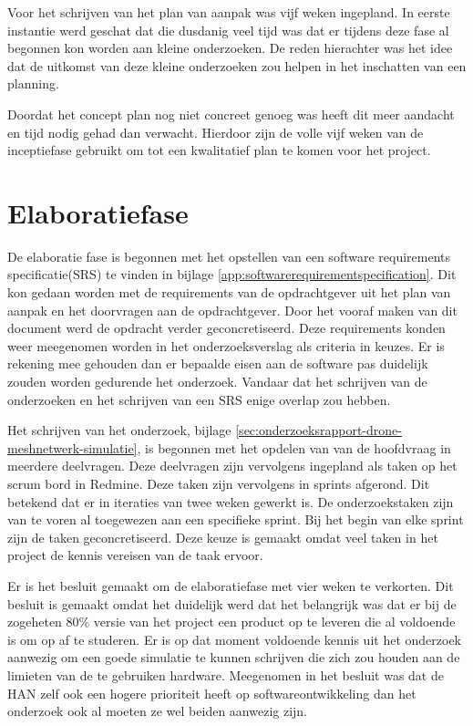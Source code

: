 \documentclass[a4paper, 11pt, oneside]{report}
\begin{document}
Voor het schrijven van het plan van aanpak was vijf weken ingepland. 
In eerste instantie werd geschat dat die dusdanig veel tijd was dat er tijdens deze fase al begonnen kon worden aan kleine onderzoeken.
De reden hierachter was het idee dat de uitkomst van deze kleine onderzoeken zou helpen in het inschatten van een planning.

Doordat het concept plan nog niet concreet genoeg was heeft dit meer aandacht en tijd nodig gehad dan verwacht. 
Hierdoor zijn de volle vijf weken van de inceptiefase gebruikt om tot een kwalitatief plan te komen voor het project.

\section{Elaboratiefase}\label{sec:elaboratiefase}

De elaboratie fase is begonnen met het opstellen van een software requirements specificatie(SRS) te vinden in bijlage \ref{app:softwarerequirementspecification}.
Dit kon gedaan worden met de requirements van de opdrachtgever uit het plan van aanpak en het doorvragen aan de opdrachtgever.
Door het vooraf maken van dit document werd de opdracht verder geconcretiseerd.
Deze requirements konden weer meegenomen worden in het onderzoeksverslag als criteria in keuzes.  
Er is rekening mee gehouden dan er bepaalde eisen aan de software pas duidelijk zouden worden gedurende het onderzoek.
Vandaar dat het schrijven van de onderzoeken en het schrijven van een SRS enige overlap zou hebben. 

Het schrijven van het onderzoek, bijlage \ref{sec:onderzoeksrapport-drone-meshnetwerk-simulatie}, is begonnen met het opdelen van van de hoofdvraag in meerdere deelvragen. 
Deze deelvragen zijn vervolgens ingepland als taken op het scrum bord in Redmine.
Deze taken zijn vervolgens in sprints afgerond. 
Dit betekend dat er in iteraties van twee weken gewerkt is. 
De onderzoekstaken zijn van te voren al toegewezen aan een specifieke sprint.
Bij het begin van elke sprint zijn de taken geconcretiseerd.
Deze keuze is gemaakt omdat  veel taken in het project de kennis vereisen van de taak ervoor.


Er is het besluit gemaakt om de elaboratiefase met vier weken te verkorten. 
Dit besluit is gemaakt omdat het duidelijk werd dat het belangrijk was dat er bij de zogeheten 80\% versie van het project een product op te leveren die al voldoende is om op af te studeren. 
Er is op dat moment voldoende kennis uit het onderzoek aanwezig om een goede simulatie te kunnen schrijven die zich zou houden aan de limieten van de te gebruiken hardware. 
Meegenomen in het besluit was dat de HAN zelf ook een hogere prioriteit heeft op softwareontwikkeling dan het onderzoek ook al moeten ze wel beiden aanwezig zijn.
\end{document}
